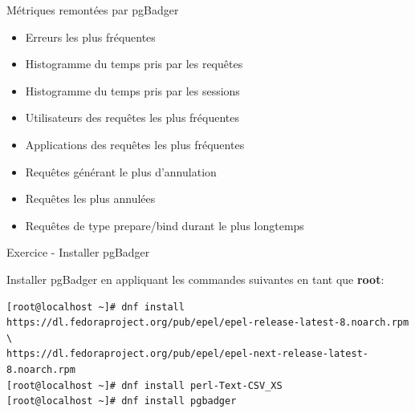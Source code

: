 
\begin{frame}{Métriques remontées par pgBadger}

   \begin{itemize}
      \item Erreurs les plus fréquentes
      \item Histogramme du temps pris par les requêtes
      \item Histogramme du temps pris par les sessions
      \item Utilisateurs des requêtes les plus fréquentes
      \item Applications des requêtes les plus fréquentes
      \item Requêtes générant le plus d'annulation
      \item Requêtes les plus annulées
      \item Requêtes de type prepare/bind durant le plus longtemps
   \end{itemize}

\end{frame}


\begin{frame}[fragile]{Exercice - Installer pgBadger}

   Installer pgBadger en appliquant les commandes suivantes en tant que \textbf{root}:


\begin{tiny}
\begin{Verbatim}[commandchars=\&\{\}]
[root@localhost ~]# dnf install https://dl.fedoraproject.org/pub/epel/epel-release-latest-8.noarch.rpm \
https://dl.fedoraproject.org/pub/epel/epel-next-release-latest-8.noarch.rpm
[root@localhost ~]# dnf install perl-Text-CSV_XS
[root@localhost ~]# dnf install pgbadger
\end{Verbatim}
\end{tiny}

\end{frame}


